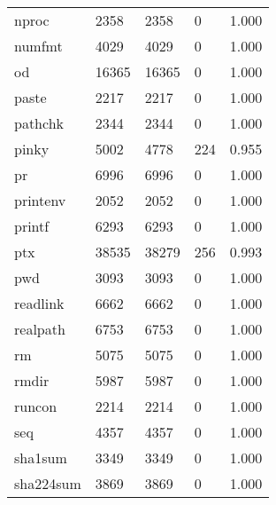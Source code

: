 \begin{longtable}{lp{3.0cm}p{3.0cm}p{3.0cm}p{3.0cm}}
nproc     &                     2358 &         2358 &             0 &                    1.000 \\
numfmt    &                     4029 &         4029 &             0 &                    1.000 \\
od        &                    16365 &        16365 &             0 &                    1.000 \\
paste     &                     2217 &         2217 &             0 &                    1.000 \\
pathchk   &                     2344 &         2344 &             0 &                    1.000 \\
pinky     &                     5002 &         4778 &           224 &                    0.955 \\
pr        &                     6996 &         6996 &             0 &                    1.000 \\
printenv  &                     2052 &         2052 &             0 &                    1.000 \\
printf    &                     6293 &         6293 &             0 &                    1.000 \\
ptx       &                    38535 &        38279 &           256 &                    0.993 \\
pwd       &                     3093 &         3093 &             0 &                    1.000 \\
readlink  &                     6662 &         6662 &             0 &                    1.000 \\
realpath  &                     6753 &         6753 &             0 &                    1.000 \\
rm        &                     5075 &         5075 &             0 &                    1.000 \\
rmdir     &                     5987 &         5987 &             0 &                    1.000 \\
runcon    &                     2214 &         2214 &             0 &                    1.000 \\
seq       &                     4357 &         4357 &             0 &                    1.000 \\
sha1sum   &                     3349 &         3349 &             0 &                    1.000 \\
sha224sum &                     3869 &         3869 &             0 &                    1.000 \\

\end{longtable}
